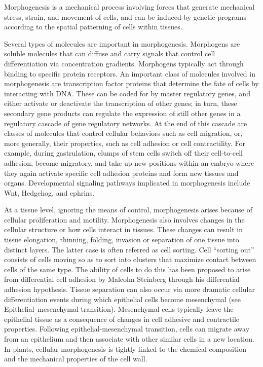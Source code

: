 Morphogenesis is a mechanical process involving forces that generate mechanical stress, strain, and movement of cells, and can be induced by genetic programs according to the spatial patterning of cells within tissues.

Several types of molecules are important in morphogenesis. Morphogens are soluble molecules that can diffuse and carry signals that control cell differentiation via concentration gradients. Morphogens typically act through binding to specific protein receptors. An important class of molecules involved in morphogenesis are transcription factor proteins that determine the fate of cells by interacting with DNA. These can be coded for by master regulatory genes, and either activate or deactivate the transcription of other genes; in turn, these secondary gene products can regulate the expression of still other genes in a regulatory cascade of gene regulatory networks. At the end of this cascade are classes of molecules that control cellular behaviors such as cell migration, or, more generally, their properties, such as cell adhesion or cell contractility. For example, during gastrulation, clumps of stem cells switch off their cell-to-cell adhesion, become migratory, and take up new positions within an embryo where they again activate specific cell adhesion proteins and form new tissues and organs. Developmental signaling pathways implicated in morphogenesis include Wnt, Hedgehog, and ephrins.

At a tissue level, ignoring the means of control, morphogenesis arises because of cellular proliferation and motility. Morphogenesis also involves changes in the cellular structure or how cells interact in tissues. These changes can result in tissue elongation, thinning, folding, invasion or separation of one tissue into distinct layers. The latter case is often referred as cell sorting. Cell ``sorting out'' consists of cells moving so as to sort into clusters that maximize contact between cells of the same type. The ability of cells to do this has been proposed to arise from differential cell adhesion by Malcolm Steinberg through his differential adhesion hypothesis. Tissue separation can also occur via more dramatic cellular differentiation events during which epithelial cells become mesenchymal (see Epithelial--mesenchymal transition). Mesenchymal cells typically leave the epithelial tissue as a consequence of changes in cell adhesive and contractile properties. Following epithelial-mesenchymal transition, cells can migrate away from an epithelium and then associate with other similar cells in a new location. In plants, cellular morphogenesis is tightly linked to the chemical composition and the mechanical properties of the cell wall.

